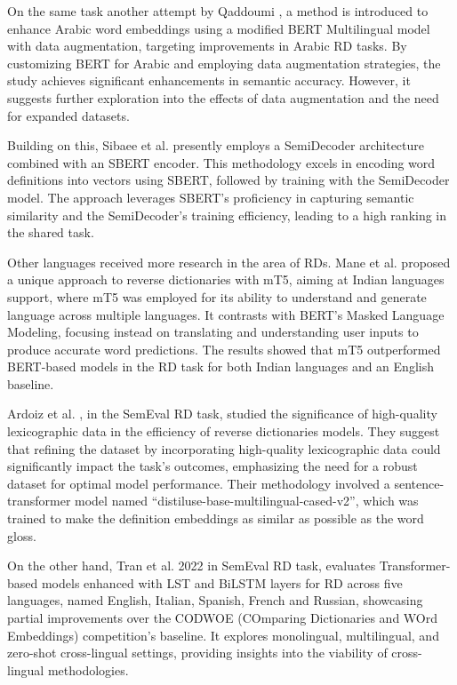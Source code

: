 \documentclass[12pt]{article}
\begin{document}
On the same task another attempt by Qaddoumi \cite{Qaddoumi2023}, a method is introduced to enhance Arabic word embeddings using a modified BERT Multilingual model with data augmentation, targeting improvements in Arabic RD tasks. By customizing BERT for Arabic and employing data augmentation strategies, the study achieves significant enhancements in semantic accuracy. However, it suggests further exploration into the effects of data augmentation and the need for expanded datasets.

Building on this, Sibaee et al. \cite{Sibaee2023} presently employs a SemiDecoder architecture combined with an SBERT encoder. This methodology excels in encoding word definitions into vectors using SBERT, followed by training with the SemiDecoder model. The approach leverages SBERT's proficiency in capturing semantic similarity and the SemiDecoder's training efficiency, leading to a high ranking in the shared task.

Other languages received more research in the area of RDs. Mane et al. \cite{Mane2022} proposed a unique approach to reverse dictionaries with mT5, aiming at Indian languages support, where mT5 was employed for its ability to understand and generate language across multiple languages. It contrasts with BERT's Masked Language Modeling, focusing instead on translating and understanding user inputs to produce accurate word predictions. The results showed that mT5 outperformed BERT-based models in the RD task for both Indian languages and an English baseline.

Ardoiz et al. \cite{Ardoiz2022}, in the SemEval RD task, studied the significance of high-quality lexicographic data in the efficiency of reverse dictionaries models. They suggest that refining the dataset by incorporating high-quality lexicographic data could significantly impact the task's outcomes, emphasizing the need for a robust dataset for optimal model performance. Their methodology involved a sentence-transformer model named “distiluse-base-multilingual-cased-v2”, which was trained to make the definition embeddings as similar as possible as the word gloss.

On the other hand, Tran et al. 2022 \cite{Tran2022} in SemEval RD task, evaluates Transformer-based models enhanced with LST and BiLSTM layers for RD across five languages, named English, Italian, Spanish, French and Russian, showcasing partial improvements over the CODWOE (COmparing Dictionaries and WOrd Embeddings) competition's baseline. It explores monolingual, multilingual, and zero-shot cross-lingual settings, providing insights into the viability of cross-lingual methodologies.
\end{document}

